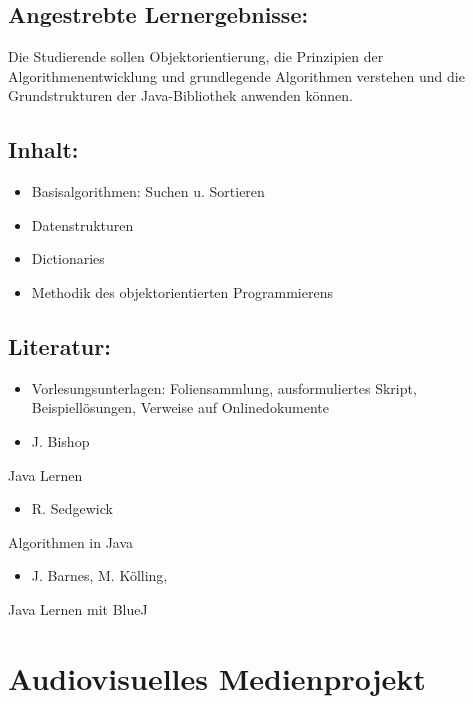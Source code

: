 \section*{Angestrebte
Lernergebnisse:}\label{angestrebte-lernergebnisse-1}

Die Studierende sollen Objektorientierung, die Prinzipien der
Algorithmenentwicklung und grundlegende Algorithmen verstehen und die
Grundstrukturen der Java-Bibliothek anwenden können.

\section*{Inhalt:}\label{inhalt-1}

\begin{itemize}
\item
  Basisalgorithmen: Suchen u. Sortieren
\item
  Datenstrukturen
\item
  Dictionaries
\item
  Methodik des objektorientierten Programmierens
\end{itemize}

\section*{Literatur:}\label{literatur-1}

\begin{itemize}
\item
  Vorlesungsunterlagen: Foliensammlung, ausformuliertes Skript,
  Beispiellösungen, Verweise auf Onlinedokumente
\item
  J. Bishop
\end{itemize}

Java Lernen

\begin{itemize}
\tightlist
\item
  R. Sedgewick
\end{itemize}

Algorithmen in Java

\begin{itemize}
\tightlist
\item
  J. Barnes, M. Kölling,
\end{itemize}

Java Lernen mit BlueJ

\chapter{Audiovisuelles
Medienprojekt}\label{audiovisuelles-medienprojekt}

